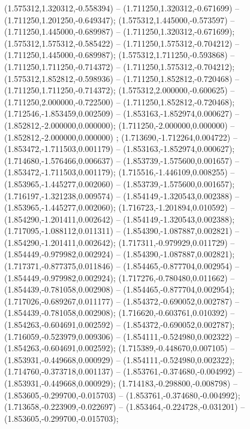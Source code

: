  (1.575312,1.320312,-0.558394) -- (1.711250,1.320312,-0.671699) -- (1.711250,1.201250,-0.649347);
 (1.575312,1.445000,-0.573597) -- (1.711250,1.445000,-0.689987) -- (1.711250,1.320312,-0.671699);
 (1.575312,1.575312,-0.585422) -- (1.711250,1.575312,-0.704212) -- (1.711250,1.445000,-0.689987);
 (1.575312,1.711250,-0.593868) -- (1.711250,1.711250,-0.714372) -- (1.711250,1.575312,-0.704212);
 (1.575312,1.852812,-0.598936) -- (1.711250,1.852812,-0.720468) -- (1.711250,1.711250,-0.714372);
 (1.575312,2.000000,-0.600625) -- (1.711250,2.000000,-0.722500) -- (1.711250,1.852812,-0.720468);
 (1.712546,-1.853459,0.002509) -- (1.853163,-1.852974,0.000627) -- (1.852812,-2.000000,0.000000);
 (1.711250,-2.000000,0.000000) -- (1.852812,-2.000000,0.000000) ;
 (1.713690,-1.712264,0.004722) -- (1.853472,-1.711503,0.001179) -- (1.853163,-1.852974,0.000627);
 (1.714680,-1.576466,0.006637) -- (1.853739,-1.575600,0.001657) -- (1.853472,-1.711503,0.001179);
 (1.715516,-1.446109,0.008255) -- (1.853965,-1.445277,0.002060) -- (1.853739,-1.575600,0.001657);
 (1.716197,-1.321238,0.009574) -- (1.854149,-1.320543,0.002388) -- (1.853965,-1.445277,0.002060);
 (1.716723,-1.201894,0.010592) -- (1.854290,-1.201411,0.002642) -- (1.854149,-1.320543,0.002388);
 (1.717095,-1.088112,0.011311) -- (1.854390,-1.087887,0.002821) -- (1.854290,-1.201411,0.002642);
 (1.717311,-0.979929,0.011729) -- (1.854449,-0.979982,0.002924) -- (1.854390,-1.087887,0.002821);
 (1.717371,-0.877375,0.011846) -- (1.854465,-0.877704,0.002954) -- (1.854449,-0.979982,0.002924);
 (1.717276,-0.780480,0.011662) -- (1.854439,-0.781058,0.002908) -- (1.854465,-0.877704,0.002954);
 (1.717026,-0.689267,0.011177) -- (1.854372,-0.690052,0.002787) -- (1.854439,-0.781058,0.002908);
 (1.716620,-0.603761,0.010392) -- (1.854263,-0.604691,0.002592) -- (1.854372,-0.690052,0.002787);
 (1.716059,-0.523979,0.009306) -- (1.854111,-0.524980,0.002322) -- (1.854263,-0.604691,0.002592);
 (1.715389,-0.448670,0.007105) -- (1.853931,-0.449668,0.000929) -- (1.854111,-0.524980,0.002322);
 (1.714760,-0.373718,0.001137) -- (1.853761,-0.374680,-0.004992) -- (1.853931,-0.449668,0.000929);
 (1.714183,-0.298800,-0.008798) -- (1.853605,-0.299700,-0.015703) -- (1.853761,-0.374680,-0.004992);
 (1.713658,-0.223909,-0.022697) -- (1.853464,-0.224728,-0.031201) -- (1.853605,-0.299700,-0.015703);

